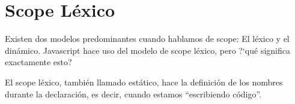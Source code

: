 \section{Scope Léxico}
\label{sec:scopelexico}

Existen dos modelos predominantes cuando hablamos de scope: El léxico y el dinámico. Javascript hace uso del modelo de scope léxico, pero ?`qué significa exactamente esto?

El scope léxico, también llamado estático, hace la definición de los nombres durante la declaración, es decir, cuando estamos "`escribiendo código"'.
